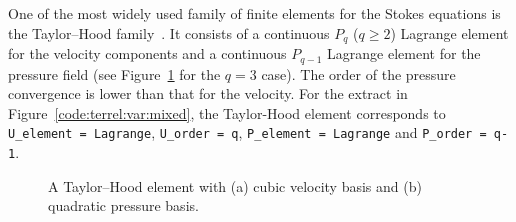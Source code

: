 One of the most widely used family of finite elements for the Stokes
equations is the Taylor--Hood family~\citep{TaylorHood1973,Boffi1997}.
It consists of a continuous $P_q$ ($q\geqslant 2$) Lagrange element for
the velocity components and a continuous $P_{q-1}$ Lagrange element for
the pressure field (see Figure~\ref{fig:terrel:THElements} for the $q=3$
case). The order of the pressure convergence is lower than that for the
velocity.  For the \ufl{} extract in Figure~\ref{code:terrel:var:mixed},
the Taylor-Hood element corresponds to {\tt U\_element = Lagrange},
{\tt U\_order = q}, {\tt P\_element = Lagrange} and {\tt P\_order = q-1}.
%
\begin{figure}
  \center
  \hspace{2em}
  \caption{A Taylor--Hood element with (a) cubic velocity basis and (b)
  quadratic pressure basis.}
\label{fig:terrel:THElements}
\end{figure}

